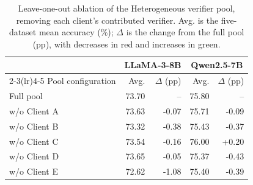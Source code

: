 \begin{table}[!t]
\centering\small
\setlength{\tabcolsep}{3pt}
\begin{tabular}{lrrrr}
\toprule
& \multicolumn{2}{c}{LLaMA-3-8B}
& \multicolumn{2}{c}{Qwen2.5-7B} \\
\cmidrule(lr){2-3}\cmidrule(lr){4-5}
Pool configuration & Avg. & $\Delta$ (pp) & Avg. & $\Delta$ (pp) \\
\midrule
Full pool    & 73.70 & -- & 75.80 & -- \\
w/o Client A & 73.63 & \textcolor{red!75!black}{-0.07}
             & 75.71 & \textcolor{red!75!black}{-0.09} \\
w/o Client B & 73.32 & \textcolor{red!75!black}{-0.38}
             & 75.43 & \textcolor{red!75!black}{-0.37} \\
w/o Client C & 73.54 & \textcolor{red!75!black}{-0.16}
             & 76.00 & \textcolor{green!45!black}{+0.20} \\
w/o Client D & 73.65 & \textcolor{red!75!black}{-0.05}
             & 75.37 & \textcolor{red!75!black}{-0.43} \\
w/o Client E & 72.62 & \textcolor{red!75!black}{-1.08}
             & 75.40 & \textcolor{red!75!black}{-0.39} \\
\bottomrule
\end{tabular}
\caption{Leave-one-out ablation of the Heterogeneous verifier pool, removing each client's contributed verifier. Avg. is the five-dataset mean accuracy (\%); $\Delta$ is the change from the full pool (pp), with decreases in red and increases in green.}
\label{tab:heterogeneous_loo}
\end{table}